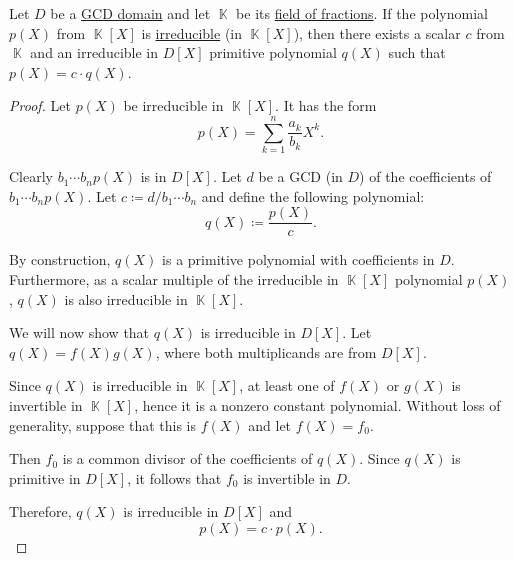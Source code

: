 \begin{lemma}\label{thm:irreducible_primitive_polynomial_in_field_of_fractions}
  Let \( D \) be a \hyperref[def:gcd_domain]{GCD domain} and let \( \BbbK \) be its \hyperref[thm:field_of_fractions]{field of fractions}. If the polynomial \( p(X) \) from \( \BbbK[X] \) is \hyperref[def:domain_divisibility/irreducible]{irreducible} (in \( \BbbK[X] \)), then there exists a scalar \( c \) from \( \BbbK \) and an irreducible in \( D[X] \) primitive polynomial \( q(X) \) such that \( p(X) = c \cdot q(X) \).
\end{lemma}
\begin{proof}
  Let \( p(X) \) be irreducible in \( \BbbK[X] \). It has the form
  \begin{equation*}
    p(X) = \sum_{k=1}^n \frac {a_k} {b_k} X^k.
  \end{equation*}

  Clearly \( b_1 \cdots b_n p(X) \) is in \( D[X] \). Let \( d \) be a GCD (in \( D \)) of the coefficients of \( b_1 \cdots b_n p(X) \). Let \( c \coloneqq d / b_1 \cdots b_n \) and define the following polynomial:
  \begin{equation*}
    q(X) \coloneqq \frac {p(X)} c.
  \end{equation*}

  By construction, \( q(X) \) is a primitive polynomial with coefficients in \( D \). Furthermore, as a scalar multiple of the irreducible in \( \BbbK[X] \) polynomial \( p(X) \), \( q(X) \) is also irreducible in \( \BbbK[X] \).

  We will now show that \( q(X) \) is irreducible in \( D[X] \). Let \( q(X) = f(X) g(X) \), where both multiplicands are from \( D[X] \).

  Since \( q(X) \) is irreducible in \( \BbbK[X] \), at least one of \( f(X) \) or \( g(X) \) is invertible in \( \BbbK[X] \), hence it is a nonzero constant polynomial. Without loss of generality, suppose that this is \( f(X) \) and let \( f(X) = f_0 \).

  Then \( f_0 \) is a common divisor of the coefficients of \( q(X) \). Since \( q(X) \) is primitive in \( D[X] \), it follows that \( f_0 \) is invertible in \( D \).

  Therefore, \( q(X) \) is irreducible in \( D[X] \) and
  \begin{equation*}
    p(X) = c \cdot p(X).
  \end{equation*}
\end{proof}

